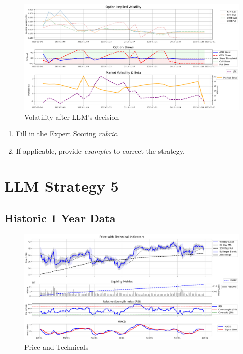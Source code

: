 \documentclass[8pt]{scrartcl}
\begin{document}
\begin{figure}[H]
    \centering
    \includegraphics[width=1\linewidth]{judge_reviews/MSFT_M_gpt-4o-mini/2015-11-02/llm_Market_Volatility_&_Beta.png}
    \caption{Volatility after LLM's decision}
\end{figure}

\begin{tcolorbox}[colback=blue!10, colframe=blue!60, title=\textbf{TASKS}, sharp corners=southwest]
\begin{enumerate}
    \item Fill in the Expert Scoring \textit{rubric}.
    \item If applicable, provide \textit{examples} to correct the strategy.
\end{enumerate}
\end{tcolorbox}
\newpage

\section*{LLM Strategy 5}
\label{app:s5}

\subsection*{Historic 1 Year Data}

\begin{figure}[H]
    \centering
    \includegraphics[width=1\linewidth]{judge_reviews/GOOGL_M_gpt-4o-mini//2017-01-02/judge_Price_with_Technical_Indicators.png}
    \caption{Price and Technicals}
\end{figure}
\end{document}
